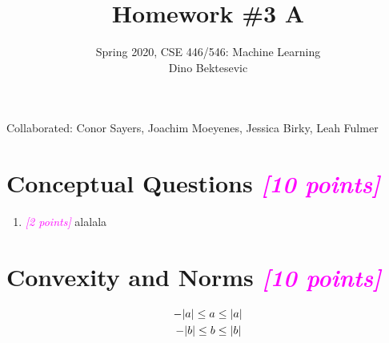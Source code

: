 \documentclass{article}
\date{{}}
\newcommand{\1}{\mathbf{1}}
\newcommand{\points}[1]{\small\textcolor{magenta}{\emph{[#1 points]}} \normalsize}
\begin{document}
\title{Homework \#3 A}
\author{\normalsize{Spring 2020, CSE 446/546: Machine Learning}\\
\normalsize{Dino Bektesevic}}
\maketitle

Collaborated: Conor Sayers, Joachim Moeyenes, Jessica Birky, Leah Fulmer

\section*{Conceptual Questions \points{10} }
\begin{enumerate}
    \item \points{2} alalala
\end{enumerate}



\section*{Convexity and Norms \points{10}}

\begin{align*}
\centering
    -|a|\leq a &\leq |a| \\
    -|b|\leq b &\leq |b|
\end{align*}

\vskip 2cm

%  


\end{document}
